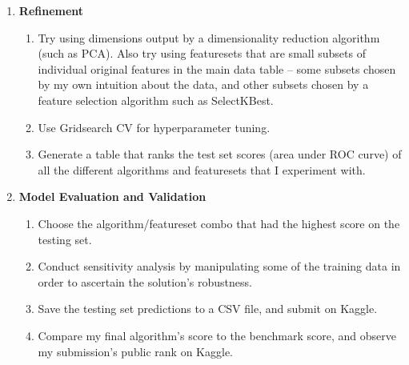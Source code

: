 \documentclass[12pt, letterpaper]{article}
\begin{document}
\begin{enumerate}
\begin{enumerate}
    \end{enumerate}
  \item \textbf{Refinement}
    \begin{enumerate}
      \item Try using dimensions output by a dimensionality reduction algorithm (such as PCA). Also try using featuresets that are small subsets of individual original features in the main data table --  some subsets chosen by my own intuition about the data, and other subsets chosen by a feature selection algorithm such as SelectKBest.
      \item Use Gridsearch CV for hyperparameter tuning.
      \item Generate a table that ranks the test set scores (area under ROC curve) of all the different algorithms and featuresets that I experiment with.
    \end{enumerate}
  \item \textbf{Model Evaluation and Validation}
    \begin{enumerate}
      \item Choose the algorithm/featureset combo that had the highest score on the testing set.
      \item Conduct sensitivity analysis by manipulating some of the training data in order to ascertain the solution's robustness.
      \item Save the testing set predictions to a CSV file, and submit on Kaggle.
      \item Compare my final algorithm's score to the benchmark score, and observe my submission's public rank on Kaggle.
    \end{enumerate}
\end{enumerate}

\renewcommand{\labelenumi}{\arabic{enumi}}
\end{document}
